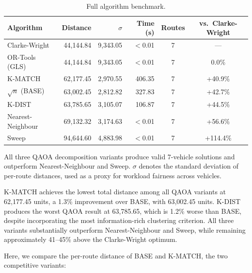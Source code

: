 \documentclass[a4paper]{report}
\begin{document}
{\begin{itemize}
\begin{itemize}
\begin{table}[h]
\centering
\begin{tabular}{lrrrcc}
\hline
\textbf{Algorithm} & \textbf{Distance} & \textbf{$\sigma$} & \textbf{Time (s)} 
& \textbf{Routes} & \textbf{vs.\ Clarke-Wright} \\
\hline
Clarke-Wright        & 44,144.84 & 9,343.05 & $<$0.01  & 7 & ---        \\
OR-Tools (GLS)       & 44,144.84 & 9,343.05 & $<$0.01  & 7 & 0.0\%      \\
K-MATCH     & 62,177.45 & 2,970.55 & 406.35 & 7 & +40.9\% \\
$\sqrt{n}$ (BASE) & 63,002.45 & 2,812.82 & 327.83 & 7 & +42.7\% \\
K-DIST               & 63,785.65 & 3,105.07 & 106.87 & 7 & +44.5\% \\
Nearest-Neighbour    & 69,132.32 & 3,174.63 & $<$0.01  & 7 & +56.6\%    \\
Sweep                & 94,644.60 & 4,883.98 & $<$0.01  & 7 & +114.4\%   \\
\hline
\end{tabular}
\caption{Full algorithm benchmark.}
\label{tab:decomp-summary}
\end{table}

All three QAOA decomposition variants produce valid 7-vehicle solutions and outperform Nearest-Neighbour and Sweep. $\sigma$ denotes the standard deviation of per-route distances, used as a proxy for workload fairness across vehicles.

K-MATCH achieves the lowest total distance among all QAOA variants at 62,177.45 units, a 1.3\% improvement over BASE, with 63,002.45 units. K-DIST produces the worst QAOA result at 63,785.65, which is 1.2\% worse than BASE, despite incorporating the most information-rich clustering criterion. All three variants substantially outperform 
Nearest-Neighbour and Sweep, while remaining approximately 41--45\% above the Clarke-Wright optimum.

Here, we compare the per-route distance of BASE and K-MATCH, the two competitive variants:


\end{itemize}
\end{itemize}}
\end{document}
